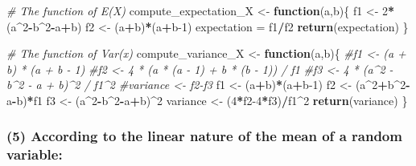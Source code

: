 \documentclass[
]{article}
\newenvironment{Shaded}{\begin{snugshade}}{\end{snugshade}}
\newcommand{\CommentTok}[1]{\textcolor[rgb]{0.56,0.35,0.01}{\textit{#1}}}
\newcommand{\ControlFlowTok}[1]{\textcolor[rgb]{0.13,0.29,0.53}{\textbf{#1}}}
\newcommand{\DecValTok}[1]{\textcolor[rgb]{0.00,0.00,0.81}{#1}}
\newcommand{\FunctionTok}[1]{\textcolor[rgb]{0.13,0.29,0.53}{\textbf{#1}}}
\newcommand{\NormalTok}[1]{#1}
\newcommand{\OtherTok}[1]{\textcolor[rgb]{0.56,0.35,0.01}{#1}}
\newcommand{\SpecialCharTok}[1]{\textcolor[rgb]{0.81,0.36,0.00}{\textbf{#1}}}
\begin{document}
\begin{Shaded}
\begin{Highlighting}[]
\CommentTok{\# The function of E(X)}
\NormalTok{compute\_expectation\_X }\OtherTok{\textless{}{-}} \ControlFlowTok{function}\NormalTok{(a,b)\{}
\NormalTok{  f1 }\OtherTok{\textless{}{-}} \DecValTok{2}\SpecialCharTok{*}\NormalTok{(a}\SpecialCharTok{\^{}}\DecValTok{2}\SpecialCharTok{{-}}\NormalTok{b}\SpecialCharTok{\^{}}\DecValTok{2}\SpecialCharTok{{-}}\NormalTok{a}\SpecialCharTok{+}\NormalTok{b)}
\NormalTok{  f2 }\OtherTok{\textless{}{-}}\NormalTok{ (a}\SpecialCharTok{+}\NormalTok{b)}\SpecialCharTok{*}\NormalTok{(a}\SpecialCharTok{+}\NormalTok{b}\DecValTok{{-}1}\NormalTok{)}
\NormalTok{  expectation }\OtherTok{=}\NormalTok{ f1}\SpecialCharTok{/}\NormalTok{f2}
  \FunctionTok{return}\NormalTok{(expectation)}
\NormalTok{\}}

\CommentTok{\# The function of Var(x)}
\NormalTok{compute\_variance\_X }\OtherTok{\textless{}{-}} \ControlFlowTok{function}\NormalTok{(a,b)\{}
  \CommentTok{\#f1 \textless{}{-} (a + b) * (a + b {-} 1)                }
  \CommentTok{\#f2 \textless{}{-} 4 * (a * (a {-} 1) + b * (b {-} 1)) / f1  }
  \CommentTok{\#f3 \textless{}{-} 4 * (a\^{}2 {-} b\^{}2 {-} a + b)\^{}2 / f1\^{}2  }
  \CommentTok{\#variance \textless{}{-} f2{-}f3           }
\NormalTok{  f1 }\OtherTok{\textless{}{-}}\NormalTok{ (a}\SpecialCharTok{+}\NormalTok{b)}\SpecialCharTok{*}\NormalTok{(a}\SpecialCharTok{+}\NormalTok{b}\DecValTok{{-}1}\NormalTok{)}
\NormalTok{  f2 }\OtherTok{\textless{}{-}}\NormalTok{ (a}\SpecialCharTok{\^{}}\DecValTok{2}\SpecialCharTok{+}\NormalTok{b}\SpecialCharTok{\^{}}\DecValTok{2}\SpecialCharTok{{-}}\NormalTok{a}\SpecialCharTok{{-}}\NormalTok{b)}\SpecialCharTok{*}\NormalTok{f1}
\NormalTok{  f3 }\OtherTok{\textless{}{-}}\NormalTok{ (a}\SpecialCharTok{\^{}}\DecValTok{2}\SpecialCharTok{{-}}\NormalTok{b}\SpecialCharTok{\^{}}\DecValTok{2}\SpecialCharTok{{-}}\NormalTok{a}\SpecialCharTok{+}\NormalTok{b)}\SpecialCharTok{\^{}}\DecValTok{2}
\NormalTok{  variance }\OtherTok{\textless{}{-}}\NormalTok{ (}\DecValTok{4}\SpecialCharTok{*}\NormalTok{f2}\DecValTok{{-}4}\SpecialCharTok{*}\NormalTok{f3)}\SpecialCharTok{/}\NormalTok{f1}\SpecialCharTok{\^{}}\DecValTok{2}
  \FunctionTok{return}\NormalTok{(variance)}
\NormalTok{\}}
\end{Highlighting}
\end{Shaded}

\subsubsection{(5) According to the linear nature of the mean of a
random
variable:}\label{according-to-the-linear-nature-of-the-mean-of-a-random-variable}
\end{document}
